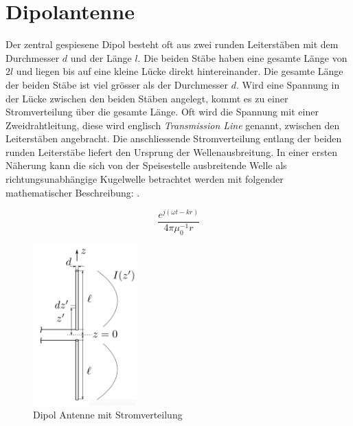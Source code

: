 
\section{Dipolantenne}\label{sec:DipolAntenne}
Der zentral gespiesene Dipol besteht oft aus zwei runden Leiterstäben mit dem Durchmesser $d$ und der Länge $l$. Die beiden Stäbe haben eine gesamte Länge von $2l$ und liegen bis auf eine kleine Lücke direkt hintereinander. Die gesamte Länge der beiden Stäbe ist viel grösser als der Durchmesser $d$. Wird eine Spannung in der Lücke zwischen den beiden Stäben angelegt, kommt es zu einer Stromverteilung über die gesamte Länge. Oft wird die Spannung mit einer Zweidrahtleitung,  diese wird englisch \textit{Transmission Line} genannt, zwischen den Leiterstäben angebracht. Die anschliessende Stromverteilung entlang der beiden runden Leiterstäbe liefert den Ursprung der Wellenausbreitung. In einer ersten Näherung kann die sich von der Speisestelle ausbreitende Welle als richtungsunabhängige Kugelwelle betrachtet werden mit folgender mathematischer Beschreibung: \cite{elliott1981antenna}.

\begin{equation}\label{term:Kugelwelle}
\frac{e^{j(\omega t-kr)}}{4\pi \mu_{0}^{-1}r}
\end{equation}

\begin{figure}[!ht]
	\centering
	\includegraphics[width=4cm]{content/bilder/Dipol_EMANT_S42.pdf}%
	\caption{Dipol Antenne mit Stromverteilung \cite{Tekom}}
	\label{FitzDipol}
\end{figure}

